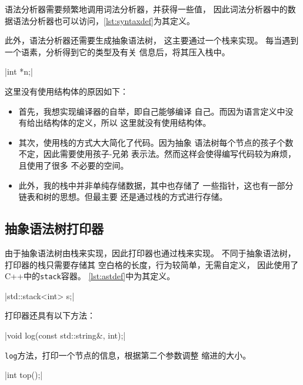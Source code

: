 语法分析器需要频繁地调用词法分析器，并获得一些值，
因此词法分析器中的数据语法分析器也可以访问，\autoref{lst:syntaxdef}为其定义。

此外，语法分析器还需要生成抽象语法树，
这主要通过一个栈来实现。
每当遇到一个语素，分析得到它的类型及有关
信息后，将其压入栈中。

\begin{listing}[hbt]
	|int *n;|
	\caption{语法分析器定义}\label{lst:syntaxdef}
\end{listing}

这里没有使用结构体的原因如下：

\begin{itemize}
	\item 首先，我想实现编译器的自举，即自己能够编译
	      自己。而因为语言定义中没有给出结构体的定义，所以
	      这里就没有使用结构体。
	\item 其次，使用栈的方式大大简化了代码。因为抽象
	      语法树每个节点的孩子个数不定，因此需要使用孩子-兄弟
	      表示法。然而这样会使得编写代码较为麻烦，且使用了很多
	      不必要的空间。
	\item 此外，我的栈中并非单纯存储数据，其中也存储了
	      一些指针，这也有一部分链表和树的思想。但最主要
	      还是通过栈的方式进行存储。
\end{itemize}

\subsection{抽象语法树打印器}

由于抽象语法树由栈来实现，因此打印器也通过栈来实现。
不同于抽象语法树，打印器的栈只需要存储其
空白格的长度，行为较简单，无需自定义，
因此使用了C++中的{\tt stack}容器。
\autoref{lst:astdef}中为其定义。

\begin{listing}[hbt]
|std::stack<int> s;|
\caption{抽象语法树定义}\label{lst:astdef}
\end{listing}

打印器还具有以下方法：

\begin{listing}[hbt]
|void log(const std::string&, int);|
\caption{{\tt log}方法}
\end{listing}

{\tt log}方法，打印一个节点的信息，根据第二个参数调整
缩进的大小。

\begin{listing}[hbt]
|int top();|
\caption{{\tt top}方法}
\end{listing}

